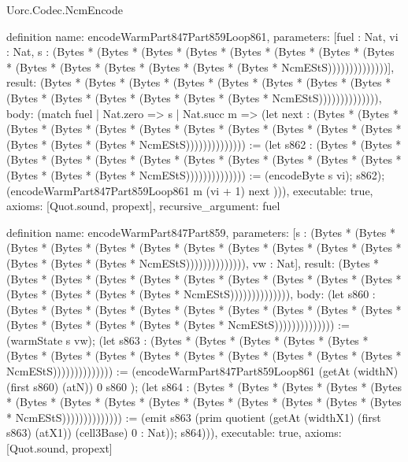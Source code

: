 \begin{lexlean}{Uorc.Codec.NcmEncode}
\begin{semanticmodule}
definition{
  name: encodeWarmPart847Part859Loop861,
  parameters: [fuel : Nat, vi : Nat, s : (Bytes * (Bytes * (Bytes * (Bytes * (Bytes * (Bytes * (Bytes * (Bytes * (Bytes * (Bytes * (Bytes * (Bytes * (Bytes * (Bytes * NcmEStS))))))))))))))],
  result: (Bytes * (Bytes * (Bytes * (Bytes * (Bytes * (Bytes * (Bytes * (Bytes * (Bytes * (Bytes * (Bytes * (Bytes * (Bytes * (Bytes * NcmEStS)))))))))))))),
  body: (match fuel
    | Nat.zero => s
    | Nat.succ m => (let next : (Bytes * (Bytes * (Bytes * (Bytes * (Bytes * (Bytes * (Bytes * (Bytes * (Bytes * (Bytes * (Bytes * (Bytes * (Bytes * (Bytes * NcmEStS)))))))))))))) := (let s862 : (Bytes * (Bytes * (Bytes * (Bytes * (Bytes * (Bytes * (Bytes * (Bytes * (Bytes * (Bytes * (Bytes * (Bytes * (Bytes * (Bytes * NcmEStS)))))))))))))) := (encodeByte s vi); s862); (encodeWarmPart847Part859Loop861 m (vi + 1) next ))),
  executable: true,
  axioms: [Quot.sound, propext],
  recursive_argument: fuel
}

definition{
  name: encodeWarmPart847Part859,
  parameters: [s : (Bytes * (Bytes * (Bytes * (Bytes * (Bytes * (Bytes * (Bytes * (Bytes * (Bytes * (Bytes * (Bytes * (Bytes * (Bytes * (Bytes * NcmEStS)))))))))))))), vw : Nat],
  result: (Bytes * (Bytes * (Bytes * (Bytes * (Bytes * (Bytes * (Bytes * (Bytes * (Bytes * (Bytes * (Bytes * (Bytes * (Bytes * (Bytes * NcmEStS)))))))))))))),
  body: (let s860 : (Bytes * (Bytes * (Bytes * (Bytes * (Bytes * (Bytes * (Bytes * (Bytes * (Bytes * (Bytes * (Bytes * (Bytes * (Bytes * (Bytes * NcmEStS)))))))))))))) := (warmState s vw); (let s863 : (Bytes * (Bytes * (Bytes * (Bytes * (Bytes * (Bytes * (Bytes * (Bytes * (Bytes * (Bytes * (Bytes * (Bytes * (Bytes * (Bytes * NcmEStS)))))))))))))) := (encodeWarmPart847Part859Loop861 (getAt (widthN) (first s860) (atN)) 0 s860 ); (let s864 : (Bytes * (Bytes * (Bytes * (Bytes * (Bytes * (Bytes * (Bytes * (Bytes * (Bytes * (Bytes * (Bytes * (Bytes * (Bytes * (Bytes * NcmEStS)))))))))))))) := (emit s863 (prim quotient (getAt (widthX1) (first s863) (atX1)) (cell3Base) 0 : Nat)); s864))),
  executable: true,
  axioms: [Quot.sound, propext]
}


\end{semanticmodule}
\end{lexlean}
